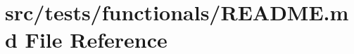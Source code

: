\hypertarget{src_2tests_2functionals_2README_8md}{}\section{src/tests/functionals/\+R\+E\+A\+D\+ME.md File Reference}
\label{src_2tests_2functionals_2README_8md}
